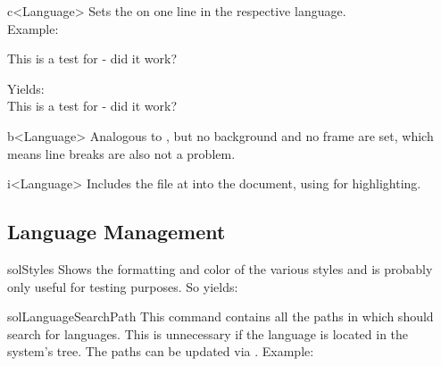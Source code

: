 \documentclass{sopra-base}
\begin{document}
\begin{command}{c<Language>}{}
    Sets the  on one line in the respective language. \\
    Example:
    \begin{plainlatex}
This is a test for  - did it work?
    \end{plainlatex}
    Yields: \\
This is a test for  - did it work?
\end{command}

\begin{command}{b<Language>}{}
   Analogous to , but no background and no frame are set, which means line breaks are also not a problem.
\end{command}

\begin{command}{i<Language>}{}
    Includes the file at  into the document, using  for highlighting.
 \end{command}

\subsection{Language Management}

\begin{command}{solStyles}{}
    Shows the formatting and color of the various styles and is probably only useful for testing purposes. So  yields: \solStyles
\end{command}

\begin{command}{solLanguageSearchPath}{}
    This command contains all the paths in which  should search for languages. This is unnecessary if the language is located in the system's  tree. The paths can be updated via . Example:
\begin{plainlatex}
\renewcommand{\solLanguageSearchPath}{{FolderA/}{FolderB/SubfolderA/}{/home/}}
\end{plainlatex}
\end{command}
\end{document}
